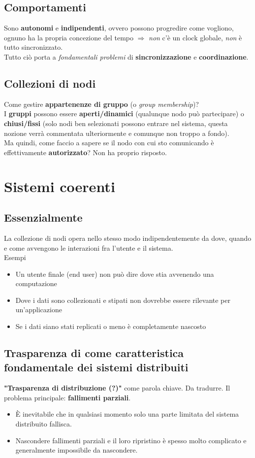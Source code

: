 \subsection{Comportamenti}
Sono \textbf{autonomi} e \textbf{indipendenti}, ovvero possono progredire come vogliono, ognuno ha la propria concezione del tempo $\Rightarrow$ \textit{non} c'è un clock globale, \textit{non} è tutto sincronizzato.
\\Tutto ciò porta a \textit{fondamentali problemi} di \textbf{sincronizzazione} e \textbf{coordinazione}.

\subsection{Collezioni di nodi}
Come gestire \textbf{appartenenze di gruppo} (o \textit{group membership})?
\\I \textbf{gruppi} possono essere \textbf{aperti/dinamici} (qualunque nodo può partecipare) o \textbf{chiusi/fissi} (solo nodi ben selezionati possono entrare nel sistema, questa nozione verrà commentata ulteriormente e comunque non troppo a fondo).
\\Ma quindi, come faccio a sapere se il nodo con cui sto comunicando è effettivamente \textbf{autorizzato}? Non ha proprio risposto.

\section{Sistemi coerenti}
\subsection{Essenzialmente}
La collezione di nodi opera nello stesso modo indipendentemente da dove, quando e come avvengono le interazioni fra l'utente e il sistema.
\\Esempi
\begin{itemize}
    \item Un utente finale (end user) non può dire dove stia avvenendo una computazione
    \item Dove i dati sono collezionati e stipati non dovrebbe essere rilevante per un'applicazione
    \item Se i dati siano stati replicati o meno è completamente nascosto
\end{itemize}

\subsection{Trasparenza di come caratteristica fondamentale dei sistemi distribuiti}
\textbf{"Trasparenza di distribuzione (?)"} come parola chiave. Da tradurre.
Il problema principale: \textbf{fallimenti parziali}.
\begin{itemize}
    \item \`E inevitabile che in qualsiasi momento solo una parte limitata del sistema distribuito fallisca.
    \item Nascondere fallimenti parziali e il loro ripristino è spesso molto complicato e generalmente impossibile da nascondere.
\end{itemize}

